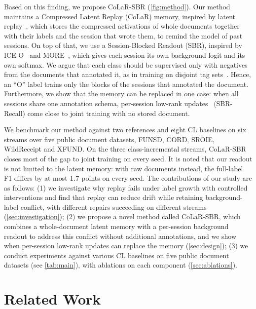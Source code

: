\documentclass[10pt,twocolumn,letterpaper]{article}
\begin{document}
Based on this finding, we propose CoLaR-SBR (\cref{fig:method}). Our method maintains a Compressed Latent Replay (CoLaR) memory, inspired by latent replay~\citep{hayes2020remind,pellegrini2020latent}, which stores the compressed activations of whole documents together with their labels and the session that wrote them, to remind the model of past sessions. On top of that, we use a Session-Blocked Readout (SBR), inspired by ICE-O~\citep{liu2023ice} and MORE~\citep{kim2022more}, which gives each session its own background logit and its own softmax. We argue that each class should be supervised only with negatives from the documents that annotated it, as in training on disjoint tag sets~\citep{greenberg2018marginal}. Hence, an ``O'' label trains only the blocks of the sessions that annotated the document. Furthermore, we show that the memory can be replaced in one case: when all sessions share one annotation schema, per-session low-rank updates~\citep{hu2022lora} (SBR-Recall) come close to joint training with no stored document.

We benchmark our method against two references and eight CL baselines on six streams over five public document datasets, FUNSD, CORD, SROIE, WildReceipt and XFUND. On the three class-incremental streams, CoLaR-SBR closes most of the gap to joint training on every seed. It is noted that our readout is not limited to the latent memory: with raw documents instead, the full-label F1 differs by at most $1.7$ points on every seed. The contributions of our study are as follows: (1) we investigate why replay fails under label growth with controlled interventions and find that replay can reduce drift while retaining background-label conflict, with different repairs succeeding on different streams (\cref{sec:investigation}); (2) we propose a novel method called CoLaR-SBR, which combines a whole-document latent memory with a per-session background readout to address this conflict without additional annotations, and we show when per-session low-rank updates can replace the memory (\cref{sec:design}); (3) we conduct experiments against various CL baselines on five public document datasets (see \cref{tab:main}), with ablations on each component (\cref{sec:ablations}).
\section{Related Work}
\label{sec:related}
\end{document}
